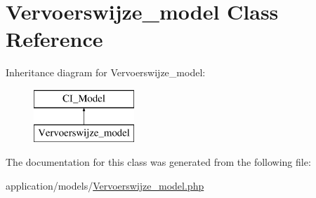 \hypertarget{class_vervoerswijze__model}{}\section{Vervoerswijze\+\_\+model Class Reference}
\label{class_vervoerswijze__model}
Inheritance diagram for Vervoerswijze\+\_\+model\+:\begin{figure}[H]
\begin{center}
\leavevmode
\includegraphics[height=2.000000cm]{class_vervoerswijze__model}
\end{center}
\end{figure}


The documentation for this class was generated from the following file\+:\begin{DoxyCompactItemize}
\item 
application/models/\mbox{\hyperlink{_vervoerswijze__model_8php}{Vervoerswijze\+\_\+model.\+php}}\end{DoxyCompactItemize}
